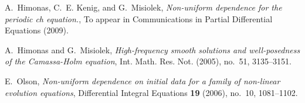 \documentclass[12pt,reqno]{amsart}
\begin{document}
\begin{thebibliography}{dLKT07}
A.~Himonas, C.~E. Kenig, and G.~Misiolek, \emph{Non-uniform dependence for the
  periodic ch equation.}, To appear in Communications in Partial Differential
  Equations (2009).

A.~Himonas and G.~Misiolek, \emph{High-frequency smooth solutions and
  well-posedness of the {C}amassa-{H}olm equation}, Int. Math. Res. Not.
  (2005), no.~51, 3135--3151. 

E.~Olson, \emph{Non-uniform dependence on initial data for a family of
  non-linear evolution equations}, Differential Integral Equations \textbf{19}
  (2006), no.~10, 1081--1102.

\end{thebibliography}
%
%
\end{document}
